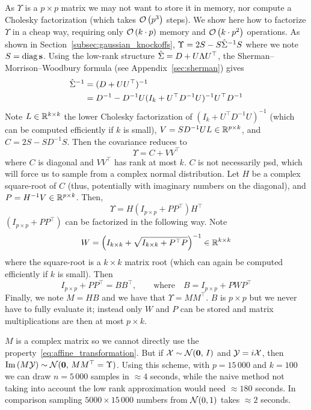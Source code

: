 As $\Upsilon$ is a $p \times p$ matrix we may not want to store it in memory,
nor compute a Cholesky factorization (which takes $\mathcal{O}\left( p^3 \right)$ steps).
We show here how to factorize $\Upsilon$ in a cheap way,
requiring only $\mathcal{O}\left( k \cdot p \right)$ memory and $\mathcal{O}\left( k\cdot p^2 \right)$ operations.
As shown in Section~\ref{subsec:gaussian_knockoffs}, $\Upsilon = 2S - S\hat{\Sigma}^{-1}S$ where we note $S = \operatorname*{diag}\mathbf{s}$.
Using the low-rank structure $\hat{\Sigma} = D + U\Lambda U^\top$,
the Sherman–Morrison–Woodbury formula (see Appendix~\ref{sec:sherman}) gives
\begin{align*}
    \hat{\Sigma}^{-1} &= (D + UU^\top)^{-1}\\
    &= D^{-1} - D^{-1}U(I_k + U^\top D^{-1}U)^{-1}U^\top D^{-1}
\end{align*}
Note $L \in \mathbb{R}^{k \times k}$ the lower Cholesky factorization of
$(I_k + U^\top D^{-1}U)^{-1}$ (which can be computed efficiently if $k$ is small),
$V = SD^{-1}UL \in \mathbb{R}^{p \times k}$,
and $C = 2S - SD^{-1}S$.
Then the covariance reduces to
\begin{equation*}
    \Upsilon = C + VV^\top
\end{equation*}
where $C$ is diagonal and $VV^\top$ has rank at most $k$.
$C$ is not necessarily psd, which will force us to sample from a complex normal distribution.
Let $H$ be a complex square-root of $C$ (thus, potentially with imaginary numbers on the diagonal),
and $P = H^{-1}V \in \mathbb{R}^{p \times k}$.
Then,
\begin{equation*}
    \Upsilon = H \left( I_{p \times p} + PP^\top \right) H^\top
\end{equation*}
$\left( I_{p \times p} + PP^\top \right)$ can be factorized in the following way.
Note
\begin{equation*}
    W = \left(I_{k \times k} + \sqrt{I_{k \times k} + P^\top P}\right)^{-1} \in \mathbb{R}^{k \times k}
\end{equation*}
where the square-root is a $k \times k$ matrix root (which can again be computed efficiently if $k$ is small).
Then
\begin{equation*}
    I_{p \times p} + PP^\top = BB^\top
    ,\qquad
    \text{where}
    \quad
    B = I_{p \times p} + PWP^\top
\end{equation*}
Finally, we note $M = HB$ and we have that $\Upsilon = MM^\top$.
$B$ is $p \times p$ but we never have to fully evaluate it;
instead only $W$ and $P$ can be stored and matrix multiplications are then at most $p \times k$.

$M$ is a complex matrix so we cannot directly use the property~\ref{eq:affine_transformation}.
But if $\mathcal{X} \sim \mathcal{N}(\mathbf{0},\, I)$ and $\mathcal{Y} = i\mathcal{X}$,
then $\operatorname{Im}\left( M\mathcal{Y} \right) \sim \mathcal{N}(\mathbf{0},\, MM^\top = \Upsilon)$.
Using this scheme, with $p = 15\,000$ and $k = 100$ we can draw $n = 5\,000$ samples in $\approx 4$ seconds,
while the naive method not taking into account the low rank approximation would need $\approx 180$ seconds.
In comparison sampling $5000 \times 15\,000$ numbers from $\mathcal{N}(0, 1)$ takes $\approx 2$ seconds.
